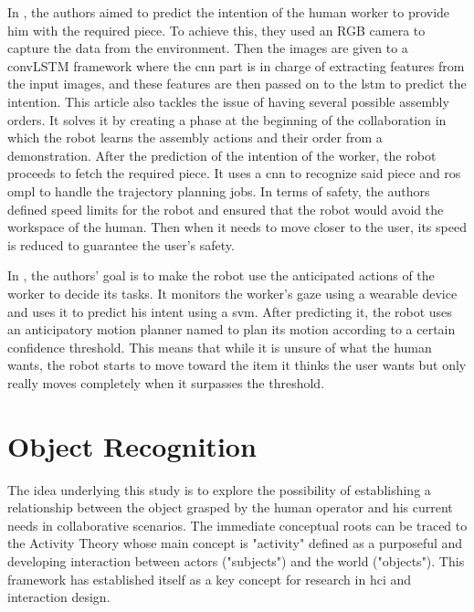 In \textcite{Zhang2022}, the authors aimed to predict the intention of the human worker to provide him with the required piece. To achieve this, they used an RGB camera to capture the data from the environment. Then the images are given to a convLSTM framework where the \acs{cnn} part is in charge of extracting features from the input images, and these features are then passed on to the \acs{lstm} to predict the intention. This article also tackles the issue of having several possible assembly orders. It solves it by creating a phase at the beginning of the collaboration in which the robot learns the assembly actions and their order from a demonstration. After the prediction of the intention of the worker, the robot proceeds to fetch the required piece. It uses a \acs{cnn} to recognize said piece and \acs{ros} \acf{ompl} to handle the trajectory planning jobs. In terms of safety, the authors defined speed limits for the robot and ensured that the robot would avoid the workspace of the human. Then when it needs to move closer to the user, its speed is reduced to guarantee the user's safety.

In \textcite{Huang2016}, the authors' goal is to make the robot use the anticipated actions of the worker to decide its tasks. It monitors the worker's gaze using a wearable device and uses it to predict his intent using a \acf{svm}. After predicting it, the robot uses an anticipatory motion planner named  to plan its motion according to a certain confidence threshold. This means that while it is unsure of what the human wants, the robot starts to move toward the item it thinks the user wants but only really moves completely when it surpasses the threshold.

\section{Object Recognition}
\label{section:object_recognition}

The idea underlying this study is to explore the possibility of establishing a relationship between the object grasped by the human operator and his current needs in collaborative scenarios. The immediate conceptual roots can be traced to the Activity Theory \cite{Kuutti1996} whose main concept is "activity" defined as a purposeful and developing interaction between actors ("subjects") and the world ("objects"). This framework has established itself as a key concept for research in \acf{hci} and interaction design.

